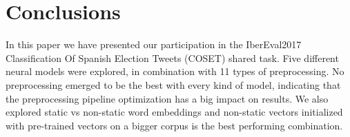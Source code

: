 \section{Conclusions} \label{sec:conclusion}

In this paper we have presented our participation in the IberEval2017 Classification Of Spanish Election Tweets (COSET) shared task. Five different neural models were explored, in combination with 11 types of preprocessing. No preprocessing emerged to be the best with every kind of model, indicating that the preprocessing pipeline optimization has a big impact on results.
We also explored static vs non-static word embeddings and non-static vectors initialized with pre-trained vectors on a bigger corpus is the best performing combination.


